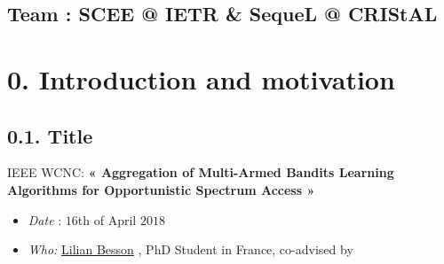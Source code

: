\documentclass[12pt,english,ignorenonframetext,]{beamer}
\begin{document}
\subsection*{\hfill{}Team {:} SCEE @ IETR \& SequeL @ CRIStAL\hfill{}}




\section{\hfill{}0. Introduction and motivation\hfill{}}

\subsection{\hfill{}0.1. Title\hfill{}}

\begin{block}{IEEE WCNC: \textbf{« Aggregation of Multi-Armed Bandits
Learning Algorithms for Opportunistic Spectrum Access »}}

\begin{itemize}
\item
  \emph{Date} : \(16\)th of April \(2018\)
\item
  \emph{Who:} \href{https://GitHub.com/Naereen/slides/}{Lilian Besson} ,
  PhD Student in France, co-advised by
\end{itemize}


\end{block}
\end{document}
